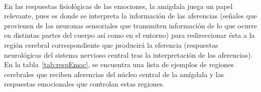 \paragraph{}
En las respuestas fisiológicas de las emociones, la amígdala juega un papel relevante, pues es donde se interpreta la información de las 	aferencias (señales que provienen de las neuronas sensoriales que transmiten información de lo que ocurre en distintas partes del cuerpo así como en el entorno) para redireccionar ésta a la región cerebral correspondiente que producirá la eferencia (respuestas neurológicas del sistema nervioso central tras la interpretación de las aferencias). En la tabla~\ref{tab:respEmoc}, se encuentra una lista de ejemplos de regiones cerebrales que reciben aferencias del núcleo central de la amígdala y las respuestas emocionales que controlan estas regiones.

